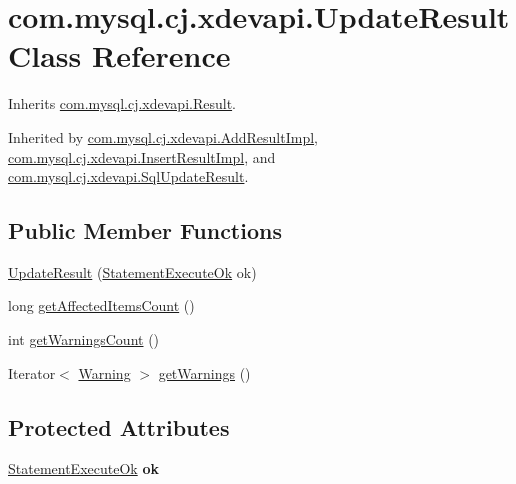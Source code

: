 \hypertarget{classcom_1_1mysql_1_1cj_1_1xdevapi_1_1_update_result}{}\section{com.\+mysql.\+cj.\+xdevapi.\+Update\+Result Class Reference}
\label{classcom_1_1mysql_1_1cj_1_1xdevapi_1_1_update_result}


Inherits \mbox{\hyperlink{interfacecom_1_1mysql_1_1cj_1_1xdevapi_1_1_result}{com.\+mysql.\+cj.\+xdevapi.\+Result}}.



Inherited by \mbox{\hyperlink{classcom_1_1mysql_1_1cj_1_1xdevapi_1_1_add_result_impl}{com.\+mysql.\+cj.\+xdevapi.\+Add\+Result\+Impl}}, \mbox{\hyperlink{classcom_1_1mysql_1_1cj_1_1xdevapi_1_1_insert_result_impl}{com.\+mysql.\+cj.\+xdevapi.\+Insert\+Result\+Impl}}, and \mbox{\hyperlink{classcom_1_1mysql_1_1cj_1_1xdevapi_1_1_sql_update_result}{com.\+mysql.\+cj.\+xdevapi.\+Sql\+Update\+Result}}.

\subsection*{Public Member Functions}
\begin{DoxyCompactItemize}
\item 
\mbox{\hyperlink{classcom_1_1mysql_1_1cj_1_1xdevapi_1_1_update_result_a931d745fc11aee840dd19c930eb4b465}{Update\+Result}} (\mbox{\hyperlink{classcom_1_1mysql_1_1cj_1_1protocol_1_1x_1_1_statement_execute_ok}{Statement\+Execute\+Ok}} ok)
\item 
long \mbox{\hyperlink{classcom_1_1mysql_1_1cj_1_1xdevapi_1_1_update_result_a0af03ef8678c7e0aba1569e7bda5b979}{get\+Affected\+Items\+Count}} ()
\item 
int \mbox{\hyperlink{classcom_1_1mysql_1_1cj_1_1xdevapi_1_1_update_result_a5a4640f6081699843d69643728e1038b}{get\+Warnings\+Count}} ()
\item 
Iterator$<$ \mbox{\hyperlink{interfacecom_1_1mysql_1_1cj_1_1protocol_1_1_warning}{Warning}} $>$ \mbox{\hyperlink{classcom_1_1mysql_1_1cj_1_1xdevapi_1_1_update_result_a44b96bc6ac3193b0f276a8317d48b5b3}{get\+Warnings}} ()
\end{DoxyCompactItemize}
\subsection*{Protected Attributes}
\begin{DoxyCompactItemize}
\item 
\mbox{\label{classcom_1_1mysql_1_1cj_1_1xdevapi_1_1_update_result_a9314dbffc186019112194b43a86e0174}} 
\mbox{\hyperlink{classcom_1_1mysql_1_1cj_1_1protocol_1_1x_1_1_statement_execute_ok}{Statement\+Execute\+Ok}} {\bfseries ok}
\end{DoxyCompactItemize}


